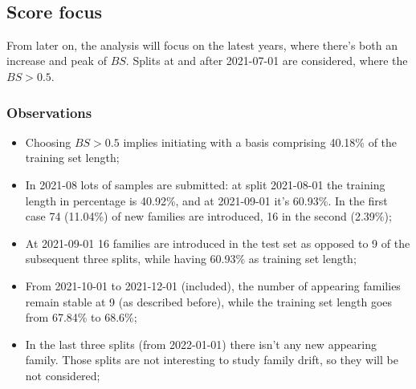 \documentclass[11pt]{article}
\providecommand{\tightlist}{%
      \setlength{\itemsep}{0pt}\setlength{\parskip}{0pt}}
\begin{document}
    \begin{center}
    \end{center}
    { \hspace*{\fill} \\}
    
    \hypertarget{score-focus}{%
\subsection{Score focus}\label{score-focus}}

From later on, the analysis will focus on the latest years, where
there's both an increase and peak of \(BS\). Splits at and after
2021-07-01 are considered, where the \(BS > 0.5\).

\hypertarget{observations}{%
\subsubsection{Observations}\label{observations}}

\begin{itemize}
\tightlist
\item
  Choosing \(BS > 0.5\) implies initiating with a basis comprising
  40.18\% of the training set length;
\item
  In 2021-08 lots of samples are submitted: at split 2021-08-01 the
  training length in percentage is 40.92\%, and at 2021-09-01 it's
  60.93\%. In the first case 74 (11.04\%) of new families are
  introduced, 16 in the second (2.39\%);
\item
  At 2021-09-01 16 families are introduced in the test set as opposed to
  9 of the subsequent three splits, while having 60.93\% as training set
  length;
\item
  From 2021-10-01 to 2021-12-01 (included), the number of appearing
  families remain stable at 9 (as described before), while the training
  set length goes from 67.84\% to 68.6\%;
\item
  In the last three splits (from 2022-01-01) there isn't any new
  appearing family. Those splits are not interesting to study family
  drift, so they will be not considered;
\end{itemize}
\end{document}

